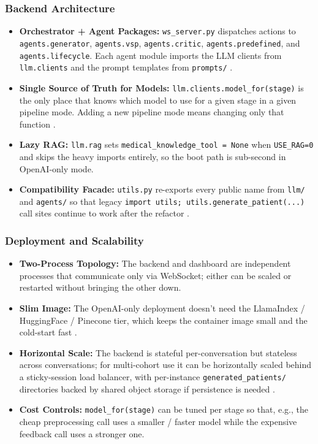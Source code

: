 \documentclass{article}
\begin{document}
\subsubsection{Backend Architecture}
\begin{itemize}
    \item \textbf{Orchestrator + Agent Packages:} \texttt{ws\_server.py} dispatches actions to \texttt{agents.generator}, \texttt{agents.vsp}, \texttt{agents.critic}, \texttt{agents.predefined}, and \texttt{agents.lifecycle}. Each agent module imports the LLM clients from \texttt{llm.clients} and the prompt templates from \texttt{prompts/} \cite{Cheptsov2013IntroducingAN}.

    \item \textbf{Single Source of Truth for Models:} \texttt{llm.clients.model\_for(stage)} is the only place that knows which model to use for a given stage in a given pipeline mode. Adding a new pipeline mode means changing only that function \cite{Kulkarni2023TheEO}.

    \item \textbf{Lazy RAG:} \texttt{llm.rag} sets \texttt{medical\_knowledge\_tool = None} when \texttt{USE\_RAG=0} and skips the heavy imports entirely, so the boot path is sub-second in OpenAI-only mode.

    \item \textbf{Compatibility Facade:} \texttt{utils.py} re-exports every public name from \texttt{llm/} and \texttt{agents/} so that legacy \texttt{import utils; utils.generate\_patient(...)} call sites continue to work after the refactor \cite{Rygl2017SemanticVE}.
\end{itemize}

\subsubsection{Deployment and Scalability}
\begin{itemize}
    \item \textbf{Two-Process Topology:} The backend and dashboard are independent processes that communicate only via WebSocket; either can be scaled or restarted without bringing the other down.

    \item \textbf{Slim Image:} The OpenAI-only deployment doesn't need the LlamaIndex / HuggingFace / Pinecone tier, which keeps the container image small and the cold-start fast \cite{Stokes2015ScalingNA}.

    \item \textbf{Horizontal Scale:} The backend is stateful per-conversation but stateless across conversations; for multi-cohort use it can be horizontally scaled behind a sticky-session load balancer, with per-instance \texttt{generated\_patients/} directories backed by shared object storage if persistence is needed \cite{Billhardt2002ACV}.

    \item \textbf{Cost Controls:} \texttt{model\_for(stage)} can be tuned per stage so that, e.g., the cheap preprocessing call uses a smaller / faster model while the expensive feedback call uses a stronger one.
\end{itemize}
\end{document}
